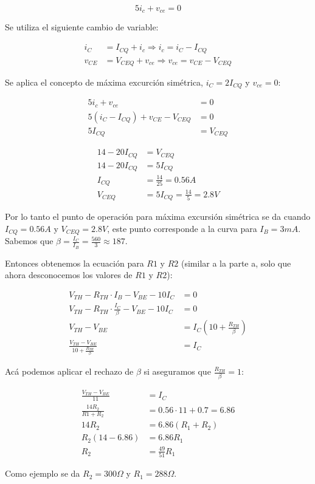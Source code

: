 \begin{equation*}
  5 i_c + v_{ce} = 0
\end{equation*}

Se utiliza el siguiente cambio de variable:

\begin{align*}
  i_C &= I_{CQ} + i_c \Rightarrow i_c = i_C - I_{CQ} \\
  v_{CE} &= V_{CEQ} + v_{ce} \Rightarrow v_{ce} = v_{CE} - V_{CEQ}
\end{align*}

Se aplica el concepto de máxima excurción simétrica, $i_C = 2 I_{CQ}$ y
$v_{ce} = 0$:

\begin{align*}
  5 i_c + v_{ce} &= 0 \\
  5 (i_C - I_{CQ}) + v_{CE} - V_{CEQ} &= 0 \\
  5 I_{CQ} &= V_{CEQ}
\end{align*}

\begin{align*}
  14 - 20 I_{CQ} &= V_{CEQ} \\
  14 - 20 I_{CQ} &= 5 I_{CQ} \\
  I_{CQ} &= \frac{14}{25} = 0.56 A \\
  V_{CEQ} &= 5 I_{CQ} = \frac{14}{5} = 2.8V
\end{align*}

Por lo tanto el punto de operación para máxima excursión simétrica se da cuando
$I_{CQ} = 0.56A$ y $V_{CEQ} = 2.8V$, este punto corresponde a la curva para
$I_B = 3mA$. Sabemos que $\beta = \frac{I_C}{I_B} = \frac{560}{3} \approx 187$.

Entonces obtenemos la ecuación para $R1$ y $R2$ (similar a la parte a, solo que
ahora desconocemos los valores de $R1$ y $R2$):

\begin{align*}
  V_{TH} - R_{TH} \cdot I_B - V_{BE} - 10 I_C &= 0 \\
  V_{TH} - R_{TH} \cdot \frac{I_C}{\beta} - V_{BE} - 10 I_C &= 0 \\
  V_{TH} - V_{BE} &= I_C \left( 10 + \frac{R_{TH}}{\beta} \right) \\
  \frac{V_{TH} - V_{BE}}{10 + \frac{R_{TH}}{\beta}} &= I_C
\end{align*}

Acá podemos aplicar el rechazo de $\beta$ si aseguramos que
$\frac{R_{TH}}{\beta} = 1$:

\begin{align*}
  \frac{V_{TH} - V_{BE}}{11} &= I_C \\
  \frac{14 R_2}{R1 + R_2} &= 0.56 \cdot 11 + 0.7 = 6.86 \\
  14 R_2 &= 6.86 ( R_1 + R_2 ) \\
  R_2 (14 - 6.86)&= 6.86 R_1 \\
  R_2 &= \frac{49}{51} R_1
\end{align*}

Como ejemplo se da $R_2 = 300\Omega$ y $R_1 = 288\Omega$.
